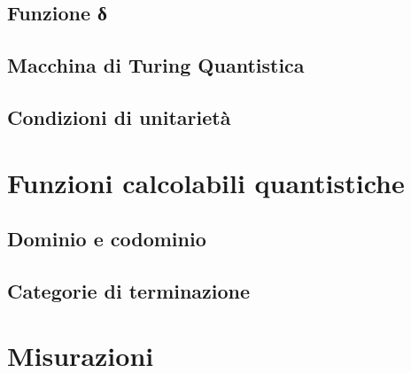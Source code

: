 \documentclass{beamer}
\begin{document}
\subsection{Funzione δ}

\subsection{Macchina di Turing Quantistica}

\subsection{Condizioni di unitarietà}

\section{Funzioni calcolabili quantistiche}

\subsection{Dominio e codominio}

\subsection{Categorie di terminazione}

\section{Misurazioni}
\end{document}
